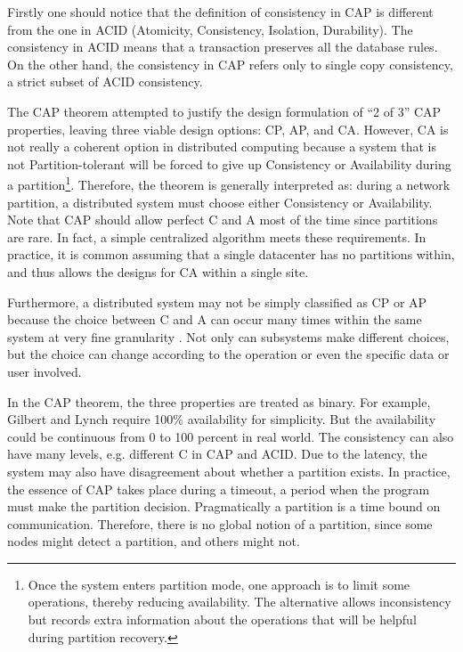 \documentclass[12pt]{book}
\begin{document}
Firstly one should notice that the definition of consistency in CAP is different from the one in ACID (Atomicity, Consistency, Isolation, Durability). The consistency in ACID means that a transaction preserves all the database rules. On the other hand, the consistency in CAP refers only to single copy consistency, a strict subset of ACID consistency. 

The CAP theorem attempted to justify the design formulation of ``2 of 3'' CAP properties, leaving three viable design options: CP, AP, and CA. However, CA is not really a coherent option in distributed computing because a system that is not Partition-tolerant will be forced to give up Consistency or Availability during a partition\footnote{Once the system enters partition mode, one approach is to limit some operations, thereby reducing availability. The alternative allows inconsistency but records extra information about the operations that will be helpful during partition recovery.}. Therefore, the theorem is generally interpreted as: during a network partition, a distributed system must choose either Consistency or Availability. Note that CAP should allow perfect C and A most of the time since partitions are rare. In fact, a simple centralized algorithm meets these requirements. In practice, it is common assuming that a single datacenter has no partitions within, and thus allows the designs for CA within a single site.

Furthermore, a distributed system may not be simply classified as CP or AP because the choice between C and A can occur many times within the same system at very fine granularity \cite{Brewer:2012}. Not only can subsystems make different choices, but the choice can change according to the operation or even the specific data or user involved.

In the CAP theorem, the three properties are treated as binary. For example, Gilbert and Lynch require 100\% availability for simplicity. But the availability could be continuous from 0 to 100 percent in real world. The consistency can also have many levels, e.g. different C in CAP and ACID. Due to the latency, the system may also have disagreement about whether a partition exists. In practice, the essence of CAP takes place during a timeout, a period when the program must make the partition decision. Pragmatically a partition is a time bound on communication. Therefore, there is no global notion of a partition, since some nodes might detect a partition, and others might not.
\end{document}
